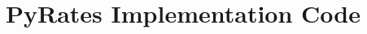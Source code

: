 \chapter{PyRates Implementation Code}\label{ch:pyrates-implementation-code}


\inputminted[mathescape, frame=lines, framesep=2mm,
    baselinestretch=1.2, fontsize=\tiny, linenos,
    bgcolor=LightGray]
{python3}{code_snippets/minimal_fig5.py}